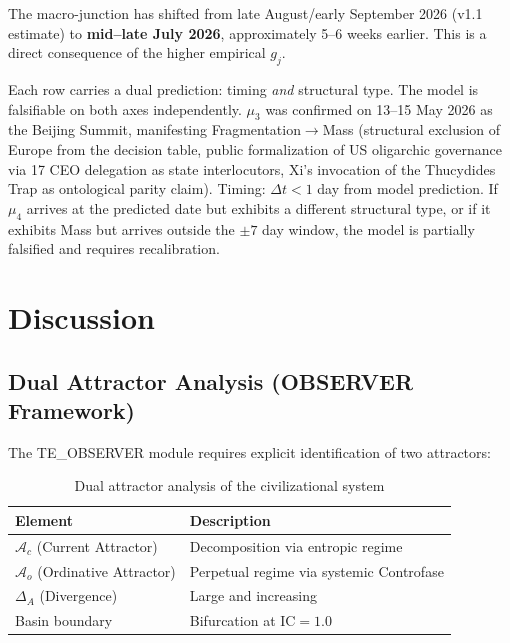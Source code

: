 \documentclass[12pt,a4paper]{article}
\newcommand{\gj}{g_j}
\newcommand{\IC}{\mathrm{IC}}
\newcommand{\Ac}{\mathcal{A}_c}          %
\newcommand{\Ao}{\mathcal{A}_o}          %
\begin{document}
\noindent The macro-junction has shifted from late August/early September 2026 (v1.1 estimate) to \textbf{mid--late July 2026}, approximately 5--6 weeks earlier. This is a direct consequence of the higher empirical $\gj$.

Each row carries a dual prediction: timing \emph{and} structural type. The model is falsifiable on both axes independently. $\mu_3$ was confirmed on 13--15 May 2026 as the Beijing Summit, manifesting Fragmentation$\to$Mass (structural exclusion of Europe from the decision table, public formalization of US oligarchic governance via 17 CEO delegation as state interlocutors, Xi's invocation of the Thucydides Trap as ontological parity claim). Timing: $\Delta t < 1$ day from model prediction. If $\mu_4$ arrives at the predicted date but exhibits a different structural type, or if it exhibits Mass but arrives outside the $\pm 7$ day window, the model is partially falsified and requires recalibration.


\section{Discussion}\label{sec:discussion}

\subsection{Dual Attractor Analysis (OBSERVER Framework)}

The TE\_OBSERVER module \cite{observer} requires explicit identification of two attractors:

\begin{table}[H]
\centering
\caption{Dual attractor analysis of the civilizational system}
\label{tab:dual_attractor}
\begin{tabular}{@{}ll@{}}
\toprule
\textbf{Element} & \textbf{Description} \\
\midrule
$\Ac$ (Current Attractor) & Decomposition via entropic regime \\
$\Ao$ (Ordinative Attractor) & Perpetual regime via systemic Controfase \\
$\Delta_A$ (Divergence) & Large and increasing \\
Basin boundary & Bifurcation at $\IC = 1.0$ \\
\bottomrule
\end{tabular}
\end{table}
\end{document}

